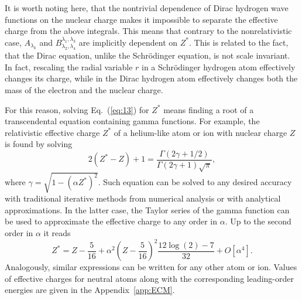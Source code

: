 It is worth noting here, that the nontrivial dependence of Dirac
hydrogen wave functions on the nuclear charge makes it impossible to
separate the effective charge from the above integrals. This means
that contrary to the nonrelativistic case, $A_{\lambda_{k}}$ and
$B^{\lambda_{1},\lambda_{3}}_{\lambda_{2},\lambda_{4}}$ are implicitly
dependent on $Z^*$. This is related to the fact, that the Dirac
equation, unlike the Schr\"{o}dinger equation, is not scale
invariant. In fact, rescaling the radial variable $r$ in a
Schr\"{o}dinger hydrogen atom effectively changes its charge, while
in the Dirac hydrogen atom effectively changes both the mass of the electron and the nuclear charge. 

For this reason, solving Eq.~(\ref{eq:13}) for $Z^*$ means finding a root of a transcendental equation containing
gamma functions. For example, the relativistic effective charge $Z^*$
of a helium-like atom or ion with nuclear charge $Z$ is found by
solving
\begin{equation}
  2(Z^*-Z)+1 = \frac{\Gamma(2\gamma+1/2)}{\Gamma(2\gamma+1)\sqrt{\pi}},
\end{equation}
where $\gamma = \sqrt{1-(\alpha Z^*)^2}$. Such equation can be solved
to any desired accuracy with traditional iterative methods from
numerical analysis or with analytical approximations. In the latter
case, the Taylor series of the gamma function can be used to
approximate the effective charge to any order in $\alpha$. Up to the
second order in $\alpha$ it reads
\begin{equation*}
  Z^* = Z-\frac{5}{16}+\alpha^2 \left(Z-\frac{5}{16}\right)^2
  \frac{12 \log(2)-7}{32}+O[\alpha^4].
\end{equation*}
%
Analogously, similar expressions can be written for any 
	other atom or ion. Values of effective charges for neutral atoms along with the corresponding leading-order energies are given in the Appendix~\ref{app:ECM}.
